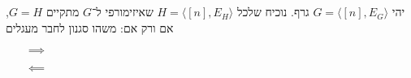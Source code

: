 \documentclass[]{article}
\newcommand\ra    {\rangle}
\newcommand\la    {\langle}
\begin{document}
	\section{}
	יהי $G = \la [n], E_G \ra$ גרף. נוכיח שלכל $H = \la [n], E_H \ra$ שאיזימורפי ל־$G$ מתקיים $G = H$, אם ורק אם:
	משהו סגנון לחבר מעגלים
	\begin{itemize}
		\item[$\implies$]
		\item[$\impliedby$]
	\end{itemize}
	\section{}
	\section{}
	\section{}
	\section{}
	\section{}
	\section{}
	
\end{document}
